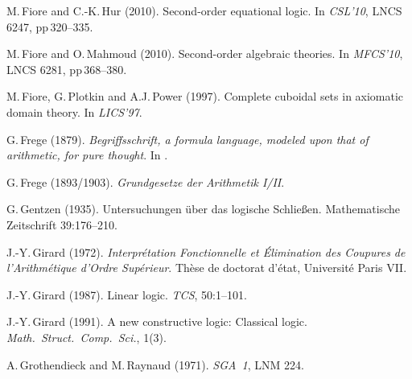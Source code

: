 \documentclass[11pt,twocolumn]{article}
\newcommand{\hide}[1]{}
\begin{document}
{\begin{thebibliography}{000}
M.\,Fiore and C.-K.\,Hur (2010).   
\newblock Second-order equational logic.  
\newblock In \emph{CSL'10}, LNCS 6247, pp\,320--335. 
  
M.\,Fiore and O.\,Mahmoud (2010).   
\newblock Second-order algebraic theories.  
\newblock In \emph{MFCS'10}, LNCS 6281, pp\,368--380. 

M.\,Fiore, G.\,Plotkin and A.J.\,Power (1997). 
\newblock Complete cuboidal sets in axiomatic domain theory.  
\newblock In \emph{LICS'97}.

G.\,Frege (1879).
\newblock \emph{Begriffsschrift, a formula language, modeled upon that of
  arithmetic, for pure thought}. 
\newblock In \emph{\cite{vanHeijenoort}}. 

G.\,Frege (1893/1903).
\newblock 
\emph{Grundgesetze der Arithmetik I/II}.

G.\,Gentzen (1935). 
\newblock Untersuchungen \"uber das logische Schlie{\ss}en. 
\newblock Mathematische Zeitschrift 39:176--210.


J.-Y.\,Girard (1972).
\newblock \emph{Interpr\'{e}tation Fonctionnelle et \'{E}li\-mi\-na\-tion des
  Coupures de l'Arithm\'{e}tique d'Ordre Sup\'{e}rieur}.
\newblock Th\`{e}se de doctorat d'\'{e}tat, Universit\'{e} Paris VII. 

J.-Y.\,Girard (1987). 
\newblock Linear logic.
\newblock \emph{TCS}, 50:1--101.

J.-Y.\,Girard (1991). 
\newblock A new constructive logic: Classical logic.
\newblock \emph{Math.\ Struct.\ Comp.\ Sci.}, 1(3).

\hide{
\bibitem{Griffin}
T.\,Griffin.
\newblock A Formulae-as-Types notion of control.
\newblock In \emph{POPL'90}, pp.\,47--58.
}

A.\,Grothendieck and M.\,Raynaud (1971).
\newblock \emph{SGA~1}, LNM 224.


\end{thebibliography}}
\end{document}
